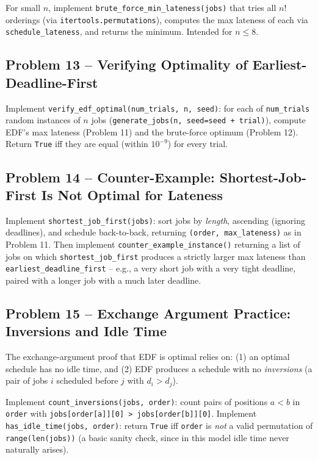 \documentclass[11pt]{article}
\begin{document}
For small $n$, implement \texttt{brute\_force\_min\_lateness(jobs)} that tries all $n!$
orderings (via \texttt{itertools.permutations}), computes the max lateness of each via
\texttt{schedule\_lateness}, and returns the minimum. Intended for $n \le 8$.

\subsection*{Problem 13 -- Verifying Optimality of Earliest-Deadline-First}

Implement \texttt{verify\_edf\_optimal(num\_trials, n, seed)}: for each of
\texttt{num\_trials} random instances of $n$ jobs (\texttt{generate\_jobs(n, seed=seed +
trial)}), compute EDF's max lateness (Problem 11) and the brute-force optimum (Problem
12). Return \texttt{True} iff they are equal (within $10^{-9}$) for every trial.

\subsection*{Problem 14 -- Counter-Example: Shortest-Job-First Is Not Optimal for Lateness}

Implement \texttt{shortest\_job\_first(jobs)}: sort jobs by \emph{length}, ascending
(ignoring deadlines), and schedule back-to-back, returning \texttt{(order,
max\_lateness)} as in Problem 11. Then implement \texttt{counter\_example\_instance()}
returning a list of jobs on which \texttt{shortest\_job\_first} produces a strictly larger
max lateness than \texttt{earliest\_deadline\_first} -- e.g., a very short job with a very
tight deadline, paired with a longer job with a much later deadline.

\subsection*{Problem 15 -- Exchange Argument Practice: Inversions and Idle Time}

The exchange-argument proof that EDF is optimal relies on: (1) an optimal schedule has no
idle time, and (2) EDF produces a schedule with no \emph{inversions} (a pair of jobs $i$
scheduled before $j$ with $d_i > d_j$).

Implement \texttt{count\_inversions(jobs, order)}: count pairs of positions $a < b$ in
\texttt{order} with \texttt{jobs[order[a]][0] > jobs[order[b]][0]}. Implement
\texttt{has\_idle\_time(jobs, order)}: return \texttt{True} iff \texttt{order} is \emph{not}
a valid permutation of \texttt{range(len(jobs))} (a basic sanity check, since in this
model idle time never naturally arises).
\end{document}
